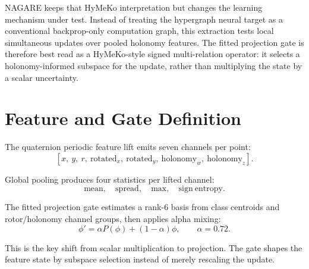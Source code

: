 \documentclass[11pt]{article}
\begin{document}
\begin{center}
\end{center}

NAGARE keeps that HyMeKo interpretation but changes the learning mechanism
under test. Instead of treating the hypergraph neural target as a conventional
backprop-only computation graph, this extraction tests local simultaneous
updates over pooled holonomy features. The fitted projection gate is therefore
best read as a HyMeKo-style signed multi-relation operator: it selects a
holonomy-informed subspace for the update, rather than multiplying the state by
a scalar uncertainty.

\section{Feature and Gate Definition}

The quaternion periodic feature lift emits seven channels per point:
\[
  [x,\ y,\ r,\ \mathrm{rotated}_x,\ \mathrm{rotated}_y,\ \mathrm{holonomy}_w,\ \mathrm{holonomy}_z].
\]

Global pooling produces four statistics per lifted channel:
\[
  \mathrm{mean},\quad \mathrm{spread},\quad \mathrm{max},\quad
  \mathrm{sign\ entropy}.
\]

The fitted projection gate estimates a rank-6 basis from class centroids and
rotor/holonomy channel groups, then applies alpha mixing:
\[
  \phi' = \alpha P(\phi) + (1-\alpha)\phi,\qquad \alpha=0.72.
\]

This is the key shift from scalar multiplication to projection. The gate shapes
the feature state by subspace selection instead of merely rescaling the update.
\end{document}
